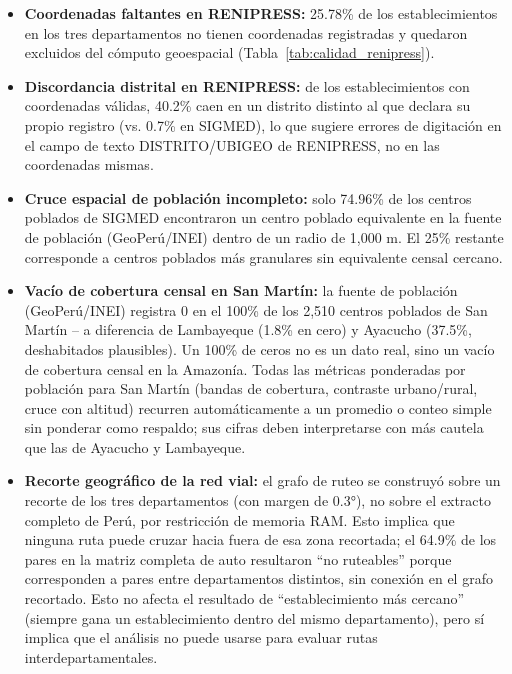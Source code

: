 \documentclass[11pt,a4paper]{article}
\begin{document}
\begin{itemize}
  \item \textbf{Coordenadas faltantes en RENIPRESS:} 25.78\% de los
  establecimientos en los tres departamentos no tienen coordenadas registradas
  y quedaron excluidos del cómputo geoespacial (Tabla~\ref{tab:calidad_renipress}).

  \item \textbf{Discordancia distrital en RENIPRESS:} de los establecimientos
  con coordenadas válidas, 40.2\% caen en un distrito distinto al que declara
  su propio registro (vs. 0.7\% en SIGMED), lo que sugiere errores de
  digitación en el campo de texto DISTRITO/UBIGEO de RENIPRESS, no en las
  coordenadas mismas.

  \item \textbf{Cruce espacial de población incompleto:} solo 74.96\% de los
  centros poblados de SIGMED encontraron un centro poblado equivalente en la
  fuente de población (GeoPerú/INEI) dentro de un radio de 1{,}000 m. El 25\%
  restante corresponde a centros poblados más granulares sin equivalente
  censal cercano.

  \item \textbf{Vacío de cobertura censal en San Martín:} la fuente de
  población (GeoPerú/INEI) registra 0 en el 100\% de los 2{,}510 centros
  poblados de San Martín -- a diferencia de Lambayeque (1.8\% en cero) y
  Ayacucho (37.5\%, deshabitados plausibles). Un 100\% de ceros no es un
  dato real, sino un vacío de cobertura censal en la Amazonía. Todas las
  métricas ponderadas por población para San Martín (bandas de cobertura,
  contraste urbano/rural, cruce con altitud) recurren automáticamente a un
  promedio o conteo simple sin ponderar como respaldo; sus cifras deben
  interpretarse con más cautela que las de Ayacucho y Lambayeque.

  \item \textbf{Recorte geográfico de la red vial:} el grafo de ruteo se
  construyó sobre un recorte de los tres departamentos (con margen de 0.3°),
  no sobre el extracto completo de Perú, por restricción de memoria RAM. Esto
  implica que ninguna ruta puede cruzar hacia fuera de esa zona recortada; el
  64.9\% de los pares en la matriz completa de auto resultaron ``no
  ruteables'' porque corresponden a pares entre departamentos distintos, sin
  conexión en el grafo recortado. Esto no afecta el resultado de
  ``establecimiento más cercano'' (siempre gana un establecimiento dentro del
  mismo departamento), pero sí implica que el análisis no puede usarse para
  evaluar rutas interdepartamentales.


\end{itemize}
\end{document}
